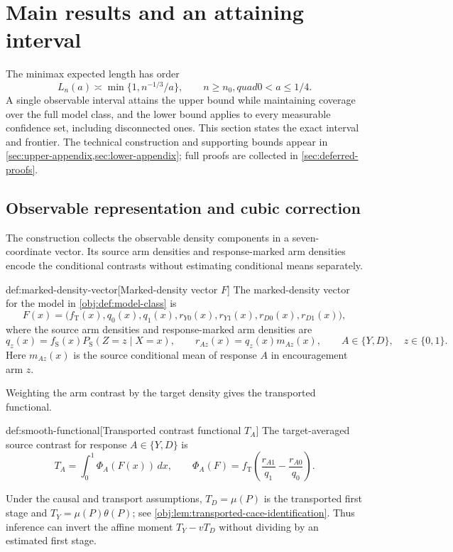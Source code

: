 \section{Main results and an attaining interval}
\label{sec:main-results}

The minimax expected length has order
\[
L_n(a)\asymp \min\{1,n^{-1/3}/a\},
\qquad n\ge n_0,quad 0<a\le 1/4.
\]
A single observable interval attains the upper bound while maintaining coverage over the full model class, and the lower bound applies to every measurable confidence set, including disconnected ones. This section states the exact interval and frontier. The technical construction and supporting bounds appear in \cref{sec:upper-appendix,sec:lower-appendix}; full proofs are collected in \cref{sec:deferred-proofs}.

\subsection{Observable representation and cubic correction}

The construction collects the observable density components in a seven-coordinate vector. Its source arm densities and response-marked arm densities encode the conditional contrasts without estimating conditional means separately.

\begin{definitionv}{def:marked-density-vector}[Marked-density vector \(F\)]
The marked-density vector for the model in \cref{obj:def:model-class} is
\[
F(x)=\bigl(f_{\mathrm T}(x),q_0(x),q_1(x),
r_{Y0}(x),r_{Y1}(x),r_{D0}(x),r_{D1}(x)\bigr),
\]
where the source arm densities and response-marked arm densities are
\[
q_z(x)=f_{\mathrm S}(x)P_{\mathrm S}(Z=z\mid X=x),
\qquad
r_{Az}(x)=q_z(x)m_{Az}(x),
\qquad A\in\{Y,D\},\quad z\in\{0,1\}.
\]
Here \(m_{Az}(x)\) is the source conditional mean of response \(A\) in encouragement arm \(z\).
\end{definitionv}

Weighting the arm contrast by the target density gives the transported functional.

\begin{definitionv}{def:smooth-functional}[Transported contrast functional \(T_A\)]
The target-averaged source contrast for response \(A\in\{Y,D\}\) is
\[
T_A=\int_0^1\Phi_A(F(x))\,dx,
\qquad
\Phi_A(F)=f_{\mathrm T}
\left(\frac{r_{A1}}{q_1}-\frac{r_{A0}}{q_0}\right).
\]
\end{definitionv}

Under the causal and transport assumptions, \(T_D=\mu(P)\) is the transported first stage and \(T_Y=\mu(P)\theta(P)\); see \cref{obj:lem:transported-cace-identification}. Thus inference can invert the affine moment \(T_Y-vT_D\) without dividing by an estimated first stage.


